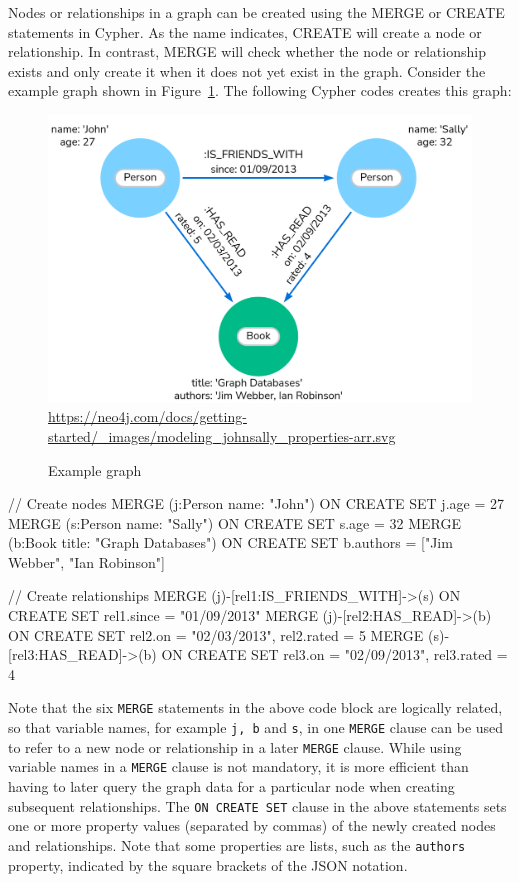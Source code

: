 Nodes or relationships in a graph can be created using the MERGE or CREATE statements in Cypher. As the name indicates, CREATE will create a node or relationship. In contrast, MERGE will check whether the node or relationship exists and only create it when it does not yet exist in the graph. Consider the example graph shown in Figure~\ref{fig:johnsallyexample}. The following Cypher codes creates this graph:

\begin{figure}[h]
\centering
\includegraphics[width=.75\textwidth]{screen4.png} \\

\scriptsize{\url{https://neo4j.com/docs/getting-started/_images/modeling_johnsally_properties-arr.svg}}
\caption{Example graph}
\label{fig:johnsallyexample}
\end{figure}

\begin{samepage}
\begin{cyphercode}
// Create nodes
MERGE (j:Person {name: "John"})
  ON CREATE SET j.age = 27
MERGE (s:Person {name: "Sally"})
  ON CREATE SET s.age = 32
MERGE (b:Book {title: "Graph Databases"})
  ON CREATE SET b.authors = ["Jim Webber", "Ian Robinson"]
  
// Create relationships
MERGE (j)-[rel1:IS_FRIENDS_WITH]->(s)
  ON CREATE SET rel1.since = "01/09/2013"
MERGE (j)-[rel2:HAS_READ]->(b)
  ON CREATE SET rel2.on = "02/03/2013", rel2.rated = 5
MERGE (s)-[rel3:HAS_READ]->(b)
  ON CREATE SET rel3.on = "02/09/2013", rel3.rated = 4
\end{cyphercode}
\end{samepage}

Note that the six \texttt{MERGE} statements in the above code block are logically related, so that variable names, for example \texttt{j, b} and \texttt{s}, in one \texttt{MERGE} clause can be used to refer to a new node or relationship in a later \texttt{MERGE} clause. While using variable names in a \texttt{MERGE} clause is not mandatory, it is more efficient than having to later query the graph data for a particular node when creating subsequent relationships. The \texttt{ON CREATE SET} clause in the above statements sets one or more property values (separated by commas) of the newly created nodes and relationships. Note that some properties are lists, such as the \texttt{authors} property, indicated by the square brackets of the JSON notation. 

